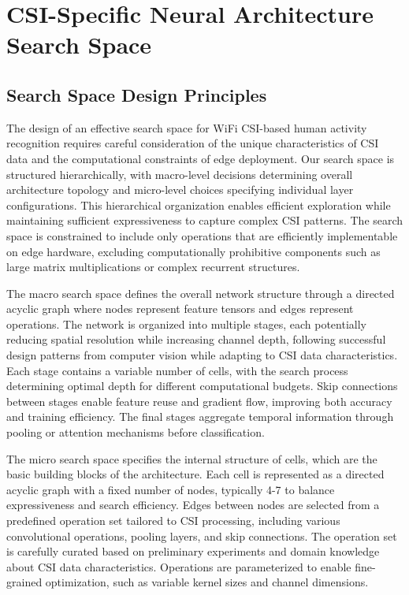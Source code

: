 \documentclass[journal]{IEEEtran}
\begin{document}
\section{CSI-Specific Neural Architecture Search Space}

\subsection{Search Space Design Principles}

The design of an effective search space for WiFi CSI-based human activity recognition requires careful consideration of the unique characteristics of CSI data and the computational constraints of edge deployment. Our search space is structured hierarchically, with macro-level decisions determining overall architecture topology and micro-level choices specifying individual layer configurations. This hierarchical organization enables efficient exploration while maintaining sufficient expressiveness to capture complex CSI patterns. The search space is constrained to include only operations that are efficiently implementable on edge hardware, excluding computationally prohibitive components such as large matrix multiplications or complex recurrent structures.

The macro search space defines the overall network structure through a directed acyclic graph where nodes represent feature tensors and edges represent operations. The network is organized into multiple stages, each potentially reducing spatial resolution while increasing channel depth, following successful design patterns from computer vision while adapting to CSI data characteristics. Each stage contains a variable number of cells, with the search process determining optimal depth for different computational budgets. Skip connections between stages enable feature reuse and gradient flow, improving both accuracy and training efficiency. The final stages aggregate temporal information through pooling or attention mechanisms before classification.

The micro search space specifies the internal structure of cells, which are the basic building blocks of the architecture. Each cell is represented as a directed acyclic graph with a fixed number of nodes, typically 4-7 to balance expressiveness and search efficiency. Edges between nodes are selected from a predefined operation set tailored to CSI processing, including various convolutional operations, pooling layers, and skip connections. The operation set is carefully curated based on preliminary experiments and domain knowledge about CSI data characteristics. Operations are parameterized to enable fine-grained optimization, such as variable kernel sizes and channel dimensions.
\end{document}
